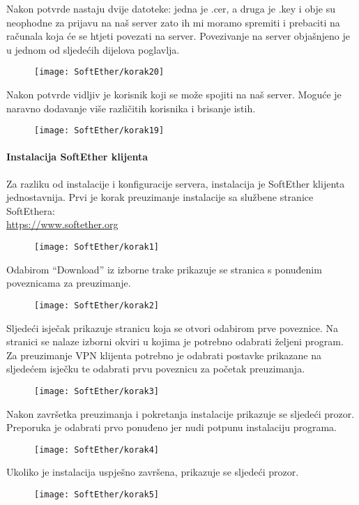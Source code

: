 \FloatBarrier
Nakon potvrde nastaju dvije datoteke: jedna je .cer, a druga je .key i obje su neophodne za prijavu na naš server zato ih mi moramo spremiti i prebaciti na računala koja će se htjeti povezati na server. Povezivanje na server objašnjeno je u jednom od sljedećih dijelova poglavlja.
\begin{figure}[h!]
     \centering
     \texttt{[image: SoftEther/korak20]}
\end{figure}
\FloatBarrier
Nakon potvrde vidljiv je korisnik koji se može spojiti na naš server. Moguće je naravno dodavanje više različitih korisnika i brisanje istih.
\begin{figure}[h!]
     \centering
     \texttt{[image: SoftEther/korak19]}
\end{figure}
\FloatBarrier

\newpage
\paragraph*{Instalacija SoftEther klijenta}

\hfill \smallbreak
Za razliku od instalacije i konfiguracije servera, instalacija je SoftEther klijenta jednostavnija. Prvi je korak preuzimanje instalacije sa službene stranice SoftEthera:\\ \url{https://www.softether.org}
\begin{figure}[h!]
	\centering
     \texttt{[image: SoftEther/korak1]}
\end{figure}
\FloatBarrier
Odabirom ``Download'' iz izborne trake prikazuje se stranica s ponuđenim poveznicama za preuzimanje.
\begin{figure}[h!]
     \centering
     \texttt{[image: SoftEther/korak2]}
\end{figure}
\FloatBarrier
Sljedeći isječak prikazuje stranicu koja se otvori odabirom prve poveznice. Na stranici se nalaze izborni okviri u kojima je potrebno odabrati željeni program. Za preuzimanje VPN klijenta potrebno je odabrati postavke prikazane na sljedećem isječku te odabrati prvu poveznicu za početak preuzimanja.
\begin{figure}[h!]
     \centering
     \texttt{[image: SoftEther/korak3]}
\end{figure}
\FloatBarrier
Nakon završetka preuzimanja i pokretanja instalacije prikazuje se sljedeći prozor. Preporuka je odabrati prvo ponuđeno jer nudi potpunu instalaciju programa.
\begin{figure}[h!]
     \centering
     \texttt{[image: SoftEther/korak4]}
\end{figure}
\FloatBarrier
Ukoliko je instalacija uspješno završena, prikazuje se sljedeći prozor.
\begin{figure}[h!]
     \centering
     \texttt{[image: SoftEther/korak5]}
\end{figure}
\FloatBarrier

